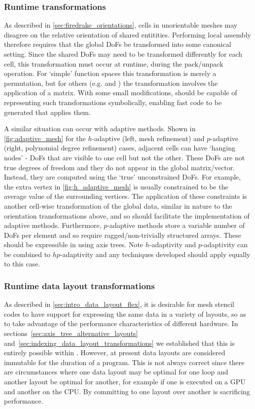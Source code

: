\documentclass[thesis]{subfiles}
\begin{document}
\subsubsection{Runtime transformations}

As described in \cref{sec:firedrake_orientations}, cells in unorientable meshes may disagree on the relative orientation of shared entitities.
Performing local assembly therefore requires that the global DoFs be transformed into some canonical setting.
Since the shared DoFs may need to be transformed differently for each cell, this transformation must occur at runtime, during the pack/unpack operation.
For `simple' function spaces this transformation is merely a permutation, but for others (e.g. \hdiv and \hcurl) the transformation involves the application of a matrix.
With some small modifications,  should be capable of representing such transformations symbolically, enabling fast code to be generated that applies them.

A similar situation can occur with adaptive methods.
Shown in \cref{fig:adaptive_mesh} for the $h$-adaptive (left, mesh refinement) and $p$-adaptive (right, polynomial degree refinement) cases, adjacent cells can have `hanging nodes' - DoFs that are visible to one cell but not the other.
These DoFs are not true degrees of freedom and they do not appear in the global matrix/vector.
Instead, they are computed using the `true' unconstrained DoFs.
For example, the extra vertex in \cref{fig:h_adaptive_mesh} is usually constrained to be the average value of the surrounding vertices.
The application of these constraints is another cell-wise transformation of the global data, similar in nature to the orientation transformations above, and so  should facilitate the implementation of adaptive methods.
Furthermore, $p$-adaptive methods store a variable number of DoFs per element and so require ragged/non-trivially structured arrays.
These should be expressible in  using axis trees.
Note $h$-adaptivity and $p$-adaptivity can be combined to $hp$-adaptivity and any techniques developed should apply equally to this case.

\subsubsection{Runtime data layout transformations}

As described in \cref{sec:intro_data_layout_flex}, it is desirable for mesh stencil codes to have support for expressing the same data in a variety of layouts, so as to take advantage of the performance characteristics of different hardware.
In sections~\ref{sec:axis_tree_alternative_layouts} and~\ref{sec:indexing_data_layout_transformations} we established that this is entirely possible within .
However, at present data layouts are considered immutable for the duration of a program.
This is not always correct since there are circumstances where one data layout may be optimal for one loop and another layout be optimal for another, for example if one is executed on a GPU and another on the CPU.
By committing to one layout over another  is sacrificing performance.
\end{document}

